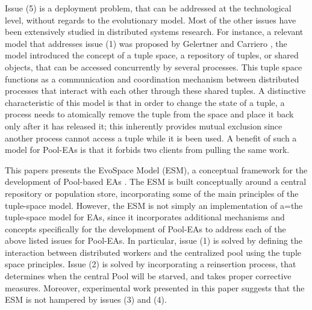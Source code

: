 Issue (5) is a deployment problem, that can be addressed at the technological level, without regards to the evolutionary model.
Most of the other issues have been extensively studied in distributed systems research.
For instance, a relevant model that addresses issue (1) was proposed by Gelertner and Carriero \cite{linda}, the model introduced the concept of a tuple space, a repository of tuples, or shared objects, that can be accessed concurrently by several processes. This tuple space functions as a communication and coordination mechanism between distributed processes that interact with each other through these shared tuples. A distinctive characteristic of this model is that in order to change the state of a tuple, a process needs to atomically remove the tuple from the space and place it back only after it has released it; this inherently provides mutual exclusion since another process cannot access a tuple while it is been used. A benefit of such a model for Pool-EAs is that it forbids two clients from pulling the same work. 

This papers presents the EvoSpace Model (ESM), a conceptual framework for the development of Pool-based EAs \cite{Evospace}.
The ESM is built conceptually around a central repository or population store, incorporating some of the main principles of the tuple-space model.
However, the ESM is not simply an implementation of a=the tuple-space model for EAs,
since it incorporates additional mechanisms and concepts specifically for the development of Pool-EAs
to address each of the above listed issues for Pool-EAs.
In particular, issue (1) is solved by defining the interaction between distributed workers and the centralized pool using the tuple space principles.
Issue (2) is solved by incorporating a reinsertion process, that determines when the central Pool will be starved, and takes proper corrective measures.
Moreover, experimental work presented in this paper suggests that the ESM is not hampered by issues (3) and (4).


